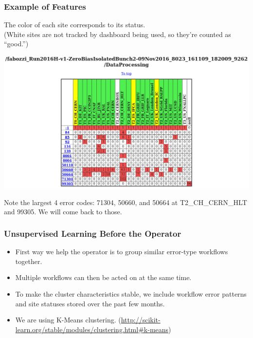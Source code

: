 \documentclass{beamer}
\begin{document}
\begin{frame}
  \frametitle{Example of Features}

  The color of each site corresponds to its status. \\
  \vspace{-6pt}
  {\tiny(White sites are not tracked by dashboard being used, so they're counted as ``good.'')}
  \vspace{6pt}

  \includegraphics[width=\linewidth]{original.png}

  Note the largest 4 error codes: 71304, 50660, and 50664 at T2\_CH\_CERN\_HLT and 99305.
  We will come back to those.

\end{frame}

\begin{frame}
  \frametitle{Unsupervised Learning Before the Operator}

  \begin{itemize}
  \item First way we help the operator is to group similar error-type workflows together.
  \item Multiple workflows can then be acted on at the same time.
  \item To make the cluster characteristics stable,
    we include workflow error patterns and site statuses stored over the past few months.
  \item We are using K-Means clustering.
    (\url{http://scikit-learn.org/stable/modules/clustering.html#k-means})
  \end{itemize}

\end{frame}
\end{document}
